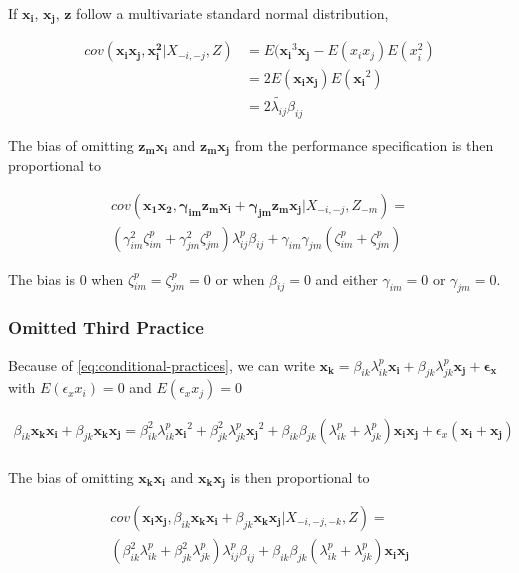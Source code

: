 \documentclass[12pt]{article}
\begin{document}
If $\mathbf{x_i}$, $\mathbf{x_j}$, $\mathbf{z}$ follow a multivariate standard normal distribution, 

\begin{align*}
    cov(\mathbf{x_i x_j}, \mathbf{x_i^2} | X_{-i, -j}, Z) 
    &= E(\mathbf{x_i}^3 \mathbf{x_j} - E(x_i x_j) E(x_i^2) \\
    &= 2 E(\mathbf{x_i x_j}) E(\mathbf{x_i}^2) \\
    &= 2 \widetilde{\lambda_{ij}} \beta_{ij}
\end{align*}


The bias of omitting $\mathbf{z_m x_i}$ and $\mathbf{z_m x_j}$ from the performance specification is then proportional to

\begin{align*}
    cov(\mathbf{x_1 x_2, \gamma_{im} \mathbf{z_m} \mathbf{x_i} + \gamma_{jm} \mathbf{z_m} \mathbf{x_j}} | X_{-i, -j}, Z_{-m}) = \\
    (\gamma^2_{im} \zeta^p_{im} + \gamma^2_{jm} \zeta^p_{jm}) \lambda^p_{ij} \beta_{ij} + \gamma_{im} \gamma_{jm} (\zeta^p_{im} + \zeta^p_{jm})  
\end{align*}

The bias is 0 when $\zeta^p_{im} = \zeta^p_{jm} = 0$ or when $\beta_{ij} = 0$ and either $\gamma_{im} = 0$ or $\gamma_{jm} = 0$.

\subsubsection{Omitted Third Practice}

Because of \eqref{eq:conditional-practices}, we can write $\mathbf{x_k} = \beta_{ik} \lambda^p_{ik} \mathbf{x_i} + \beta_{jk} \lambda^p_{jk} \mathbf{x_j} + \mathbf{\epsilon_x}$ with $E(\epsilon_x x_i) = 0$ and $E(\epsilon_x x_j) = 0$

\begin{align*}
    \beta_{ik} \mathbf{x_k} \mathbf{x_i} + \beta_{jk} \mathbf{x_k} \mathbf{x_j}
    = \beta^2_{ik} \lambda^p_{ik} \mathbf{x_i}^2 + \beta^2_{jk} \lambda^p_{jk} \mathbf{x_j}^2 
    + \beta_{ik} \beta_{jk} (\lambda^p_{ik} + \lambda^p_{jk}) \mathbf{x_i x_j} 
    + \epsilon_x ( \mathbf{x_i} + \mathbf{x_j})\\
\end{align*}

The bias of omitting $\mathbf{x_k x_i}$ and $\mathbf{x_k x_j}$ is then proportional to 

\begin{align*}
   cov(\mathbf{x_i x_j}, \beta_{ik} \mathbf{x_k} \mathbf{x_i} + \beta_{jk} \mathbf{x_k} \mathbf{x_j}| X_{-i, -j, -k}, Z) = \\
   (\beta^2_{ik} \lambda^p_{ik} + \beta^2_{jk} \lambda^p_{jk}) \lambda_{ij}^p \beta_{ij} + \beta_{ik} \beta_{jk} (\lambda^p_{ik} + \lambda^p_{jk}) \mathbf{x_i x_j}
\end{align*}
\end{document}
